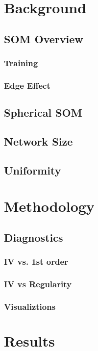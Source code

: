 \documentclass[nototal,handout]{beamer}
\begin{document}
\section{Background} 

\subsection{SOM Overview} 

\begin{frame}
	\frametitle{Training}
 \end{frame} 

\begin{frame}
	\frametitle{Edge Effect}
 \end{frame} 

\subsection{Spherical SOM} 

\subsection{Network Size} 

\subsection{Uniformity} 


\section{Methodology} 

\subsection{Diagnostics} 

\begin{frame}
	\frametitle{IV vs. 1st order}
 \end{frame} 

\begin{frame}
	\frametitle{IV vs Regularity}
 \end{frame} 

\begin{frame}
	\frametitle{Visualiztions}
 \end{frame} 


\section{Results} 
\end{document}
